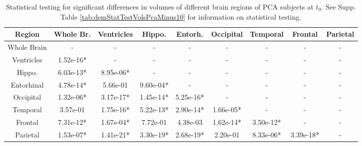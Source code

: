 
\begin{table}
\centering
\begin{tabular}{c |c c c c c c c c }
Region & Whole Br. & Ventricles & Hippo. & Entorh. & Occipital & Temporal & Frontal & Parietal\\
\hline 
Whole Brain & - & - & - & - & - & - & - & -\\
Ventricles & 1.52e-16* & - & - & - & - & - & - & -\\
Hippo. & 6.03e-13* & 8.95e-06* & - & - & - & - & - & -\\
Entorhinal & 4.78e-14* & 5.66e-01 & 9.60e-04* & - & - & - & - & -\\
Occipital & 1.32e-06* & 3.17e-17* & 1.45e-14* & 5.25e-16* & - & - & - & -\\
Temporal & 3.57e-01 & 1.75e-16* & 5.22e-13* & 2.90e-14* & 1.66e-05* & - & - & -\\
Frontal & 7.31e-12* & 1.67e-04* & 7.72e-01 & 4.38e-03 & 1.62e-14* & 3.50e-12* & - & -\\
Parietal & 1.53e-07* & 1.41e-21* & 3.30e-19* & 2.68e-19* & 2.20e-01 & 8.33e-06* & 3.39e-18* & -\\


\end{tabular} 
\caption[Statistical testing for significant differences in volumes of different brain regions of PCA subjects at $t_0$]{Statistical testing for significant differences in volumes of different brain regions of PCA subjects at $t_0$. See Supp. Table \ref{tab:demStatTestVolsPcaMinus10} for information on statistical testing.} 
\label{tab:demStatTestVolsPca0}
\end{table}


